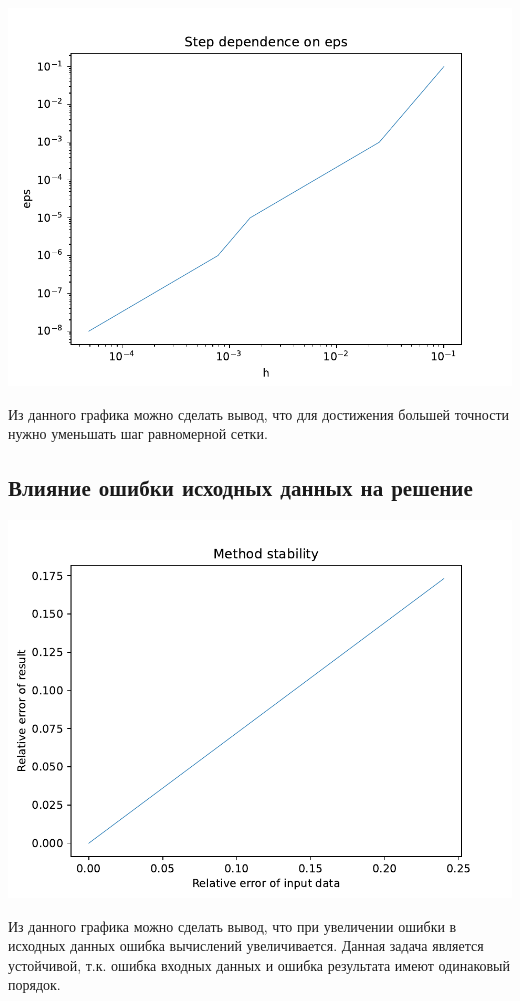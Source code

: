 \includegraphics[scale=0.75]{2.pdf}

Из данного графика можно сделать вывод, что для достижения большей точности нужно уменьшать шаг равномерной сетки.

\subsection{Влияние ошибки исходных данных на решение}

\includegraphics[scale=0.75]{3.pdf}

Из данного графика можно сделать вывод, что при увеличении ошибки в исходных данных ошибка вычислений увеличивается. Данная задача является устойчивой, т.к. ошибка входных данных и ошибка результата имеют одинаковый порядок.


